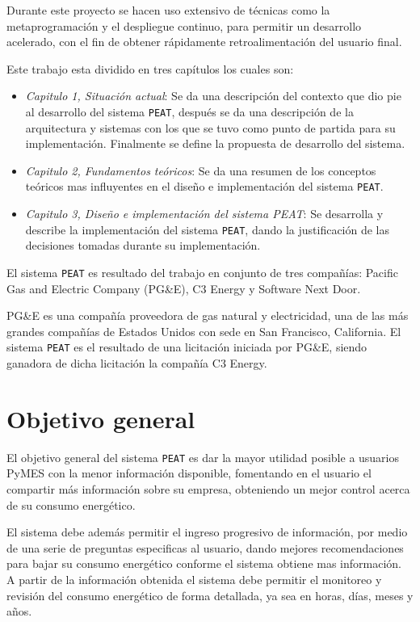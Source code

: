 Durante este proyecto se hacen uso extensivo de técnicas como la metaprogramación
y el despliegue continuo, para permitir un desarrollo acelerado, con el fin de
obtener rápidamente retroalimentación del usuario final.

Este trabajo esta dividido en tres capítulos los cuales son:
\begin{itemize}
\item \textit{Capitulo 1, Situación actual}: Se da una descripción del contexto
  que dio pie al desarrollo del sistema \texttt{PEAT}, después se da una
  descripción de la arquitectura y sistemas con los que se tuvo como punto de
  partida para su implementación. Finalmente se define la propuesta de desarrollo
  del sistema.
\item \textit{Capitulo 2, Fundamentos teóricos}: Se da una resumen de los conceptos
  teóricos mas influyentes en el diseño e implementación del sistema \texttt{PEAT}.
\item \textit{Capitulo 3, Diseño e implementación del sistema PEAT}: Se desarrolla y
  describe la implementación del sistema \texttt{PEAT}, dando la justificación
  de las decisiones tomadas durante su implementación.
\end{itemize}

El sistema \texttt{PEAT} es resultado del trabajo en conjunto de tres compañías:
Pacific Gas and Electric Company (PG\&E), C3 Energy y Software Next Door.

PG\&E es una compañía proveedora de gas natural y electricidad, una de las
más grandes compañías de Estados Unidos con sede en San Francisco, California.
El sistema \texttt{PEAT} es el resultado de una licitación iniciada por PG\&E,
siendo ganadora de dicha licitación la compañía C3 Energy.

\section*{Objetivo general}

El objetivo general del sistema \texttt{PEAT} es dar la mayor utilidad posible
a usuarios PyMES con la menor información disponible, fomentando en el usuario
el compartir más información sobre su empresa, obteniendo un mejor control
acerca de su consumo energético.

El sistema debe además permitir el ingreso progresivo de información, por medio
de una serie de preguntas especificas al usuario, dando mejores recomendaciones
para bajar su consumo energético conforme el sistema obtiene mas información.
A partir de la información obtenida el sistema debe permitir el monitoreo
y revisión del consumo energético de forma detallada, ya sea en horas,
días, meses y años.

